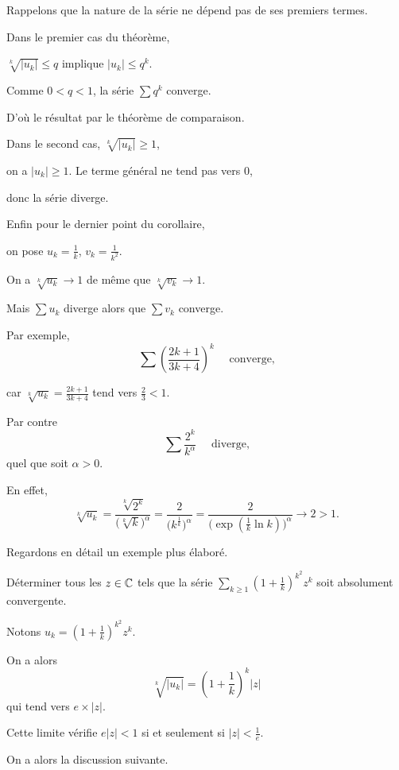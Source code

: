 Rappelons que la nature de la série ne dépend pas de ses premiers
termes. 

\change
Dans le premier cas du théorème, 

\change
$\sqrt[k]{|u_k|} \le q$ implique  $|u_k| \le q^k$. 

\change
Comme $0<q<1$, la série $\sum q^k$ converge. 

\change
D'où le résultat par le théorème de comparaison.  

\change
Dans le second cas, $\sqrt[k]{|u_k|} \ge 1$, 

\change
on a $|u_k| \ge 1$. Le terme général ne tend pas vers $0$, 

\change
donc la série diverge.  

\change
Enfin pour le dernier point du corollaire, 

\change
on pose $u_k=\frac{1}{k}$, $v_k=\frac{1}{k^2}$.

\change
On a $\sqrt[k]{u_k}\to 1$ de même que $\sqrt[k]{v_k}\to 1$.

\change
Mais $\sum u_k$ diverge alors que $\sum v_k$ converge.


\diapo

Par exemple, 
$$\sum \left(\frac{2k+1}{3k+4}\right)^k\quad \text{ converge,}$$

\change
car $\sqrt[k]{u_k} = \frac{2k+1}{3k+4}$ tend vers $\frac{2}{3}<1$.

\change
Par contre  
$$\sum \frac{2^k}{k^\alpha}\quad \text{ diverge,}$$
quel que soit $\alpha >0$.
  
\change
En effet,
$$\sqrt[k]{u_k} = \frac{\sqrt[k]{2^k}}{\big(\sqrt[k]{k}\big)^\alpha}
  = \frac{2}{\big(k^\frac{1}{k}\big)^\alpha}
  = \frac{2}{\big(\exp(\frac{1}{k}\ln k)\big)^\alpha} \to 2>1.$$


\diapo
Regardons en détail un exemple plus élaboré.

Déterminer tous les $z\in \mathbb{C}$ tels que la série  
$\sum_{k\ge1} \left( 1+\frac{1}{k}\right)^{k^2} z^k$ soit absolument convergente.

\change
Notons $u_k =\left( 1+\frac{1}{k}\right)^{k^2} z^k$.

\change
On a alors $$\sqrt[k]{|u_k|}=\left( 1+\frac{1}{k}\right)^k |z| $$
qui tend vers $e  \times |z|.$

\change
Cette limite vérifie $e|z| < 1$ si et seulement si $|z|<\frac{1}{e}$.

On a alors la discussion suivante.

